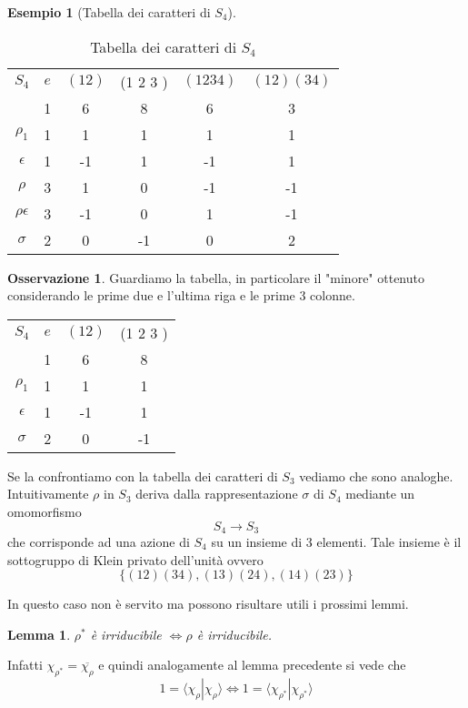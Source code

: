 \documentclass[11pt]{article}
\theoremstyle{plain}
\newtheorem{lemma}[thm]{Lemma}
\theoremstyle{definition}
\newtheorem{exmp}{Esempio}[section]
\newtheorem*{rem}{Osservazione}
\theoremstyle{remark}
\begin{document}
\begin{exmp}[Tabella dei caratteri di $S_4$]
\begin{table}[!ht]
\centering
\begin{tabular}{|c|c|c|c|c|c|}
\hline
$S_4$  & $e$ & $(1 2)$ & (1 2 3 ) & $(1 2 3 4)$ & $(1 2)(3 4)$ \\
 & 1 & 6 & 8 & 6 & 3 \\
\hline
 $\rho_1$ & 1 & 1  & 1 & 1 & 1\\
\hline
$\epsilon$ & 1  & -1 & 1 & -1 & 1 \\
\hline
$\rho$& 3 & 1 & 0 & -1 & -1\\
\hline
$\rho\epsilon$& 3 & -1 & 0 & 1 & -1\\
\hline
 $\sigma$& 2&  0 & -1& 0 & 2\\
\hline
\end{tabular}
\caption{Tabella dei caratteri di $S_4$}
\label{tabella caratteri s4}
\end{table}


\begin{rem} Guardiamo la tabella, in particolare il "minore" ottenuto considerando le prime due e l'ultima riga e le prime 3 colonne.

\begin{table}[!ht]
\centering
\begin{tabular}{|c|c|c|c|}
\hline
$S_4$  & $e$ & $(1 2)$ & (1 2 3 )    \\
 & 1 & 6 & 8 \\
\hline
 $\rho_1$ & 1 & 1  & 1 \\
\hline
$\epsilon$ & 1 & -1 & 1 \\
\hline
$\sigma$ & 2 & 0 & -1 \\
\hline
\end{tabular}
\end{table}
Se la confrontiamo con la tabella dei caratteri di $S_3$ vediamo che sono analoghe. Intuitivamente $\rho$ in $S_3$ deriva dalla rappresentazione $\sigma$ di $S_4$ mediante un omomorfismo
\[
S_4\rightarrow S_3
\]
che corrisponde ad una azione di $S_4$ su un insieme di 3 elementi. Tale insieme è il sottogruppo di Klein privato dell'unità ovvero
\[
\{ (12)(34),(13)(24),(14)(23)\}
\]
\end{rem}


In questo caso non è servito ma possono risultare utili i prossimi lemmi.
\begin{lemma}
$\rho^* $ è irriducibile $ \Leftrightarrow \rho$ è irriducibile.
\end{lemma}
Infatti $\chi_{\rho^*}=\overline{\chi_\rho} $ e quindi analogamente al lemma precedente si vede che
\[
1=\langle\chi_{\rho}|\chi_{\rho}\rangle \Leftrightarrow 1=\langle\chi_{\rho^*}|\chi_{\rho^*}\rangle
\]


\end{exmp}
\end{document}
